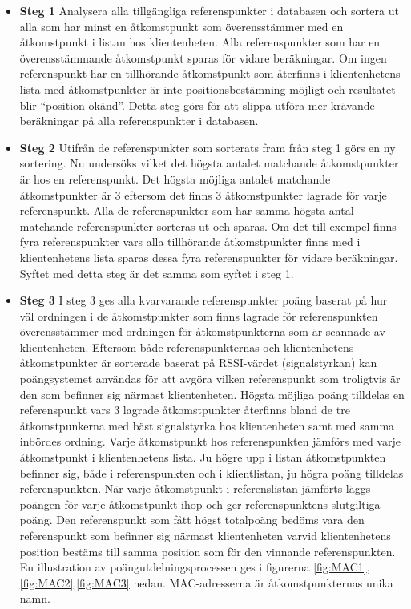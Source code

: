 \documentclass[a4paper,12pt]{article}
\begin{document}
   \begin{itemize}
     \item \textbf{Steg 1}
     \newline
     Analysera alla tillgängliga referenspunkter i databasen och sortera ut alla som har minst en åtkomstpunkt som överensstämmer med en åtkomstpunkt i listan hos klientenheten. Alla referenspunkter som har en överensstämmande åtkomstpunkt sparas för vidare beräkningar. Om ingen referenspunkt har en tillhörande åtkomstpunkt som återfinns i klientenhetens lista med åtkomstpunkter är inte positionsbestämning möjligt och resultatet blir ``position okänd''.
     Detta steg görs för att slippa utföra mer krävande beräkningar på alla referenspunkter i databasen.
     \item \textbf{Steg 2}
     \newline
     Utifrån de referenspunkter som sorterats fram från steg 1 görs en ny sortering. Nu undersöks vilket det högsta antalet matchande åtkomstpunkter är hos en referenspunkt. Det högsta möjliga antalet matchande åtkomstpunkter är 3 eftersom det finns 3 åtkomstpunkter lagrade för varje referenspunkt. Alla de referenspunkter som har samma högsta antal matchande referenspunkter sorteras ut och sparas.
     Om det till exempel finns fyra referenspunkter vars alla tillhörande åtkomstpunkter finns med i klientenhetens lista sparas dessa fyra referenspunkter för vidare beräkningar. Syftet med detta steg är det samma som syftet i steg 1.

     \item \textbf{Steg 3}
     \newline
     I steg 3 ges alla kvarvarande referenspunkter poäng baserat på hur väl ordningen i de åtkomstpunkter som finns lagrade för referenspunkten överensstämmer med ordningen för åtkomstpunkterna som är scannade av klientenheten. Eftersom både referenspunkternas och klientenhetens åtkomstpunkter är sorterade baserat på RSSI-värdet (signalstyrkan) kan poängsystemet användas för att avgöra vilken referenspunkt som troligtvis är den som befinner sig närmast klientenheten.
     Högsta möjliga poäng tilldelas en referenspunkt vars 3 lagrade åtkomstpunkter återfinns bland de tre åtkomstpunkerna med bäst signalstyrka hos klientenheten samt med samma inbördes ordning. Varje åtkomstpunkt hos referenspunkten jämförs med varje åtkomstpunkt i klientenhetens lista. Ju högre upp i listan åtkomstpunkten befinner sig, både i referenspunkten och i klientlistan, ju högra poäng tilldelas referenspunkten. När varje åtkomstpunkt i referenslistan jämförts läggs poängen för varje åtkomstpunkt ihop och ger referenspunktens slutgiltiga poäng.
     Den referenspunkt som fått högst totalpoäng bedöms vara den referenspunkt som befinner sig närmast klientenheten varvid klientenhetens position bestäms till samma position som för den vinnande referenspunkten.
     En illustration av poängutdelningsprocessen ges i figurerna \ref{fig:MAC1},\ref{fig:MAC2},\ref{fig:MAC3} nedan.
     MAC-adresserna är åtkomstpunkternas unika namn.


\end{itemize}
\end{document}
